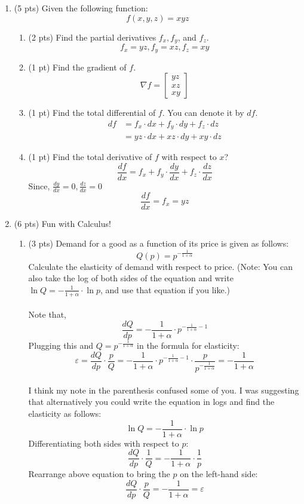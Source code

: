 \documentclass{./../../Latex/tests}
\begin{document}
\begin{enumerate}
\item (5 pts) Given the following function:
$$f(x,y,z) = xyz$$ 
\begin{enumerate}
\item (2 pts)  Find the partial derivatives $f_x, f_y$, and $f_z$. 
$$f_x=y z, f_y=x z, f_z=x y$$ 
\item (1 pt) Find the gradient of $f$. 
$$\nabla f=\left[\begin{array}{l}y z \\ x z \\ x y\end{array}\right]$$ 
\item (1 pt) Find the total differential of $f$. You can denote it by $d f$. 
$$\begin{aligned} d f &=f_x \cdot d x+f_y \cdot d y+f_z \cdot d z \\ &=y z \cdot d x+x z \cdot d y+x y \cdot d z
\end{aligned}$$	
\item (1 pt) Find the total derivative of $f$ with respect to $x$? 
$$  \frac{d f}{d x} =f_x+f_y \cdot \frac{d y}{d x}+f_z \cdot \frac{d z}{d x} $$
Since, $ \frac{d y}{d x}=0, \frac{d z}{d x}=0$ 
$$\frac{d f}{d x} =f_x=y z $$
\end{enumerate}

\item (6 pts) Fun with Calculus!
\begin{enumerate}
\item (3 pts) Demand for a good as a function of its price is given as follows:
$$ Q(p) = p^{-\frac{1}{1+\alpha}}  $$
Calculate the elasticity of demand with respect to price. (Note: You can also take the log of both sides of the equation and write $\ln Q = -\frac{1}{1+\alpha} \cdot \ln p$, and use that equation if you like.) \\~\\

Note that,
$$ \frac{dQ}{dp} = -\frac{1}{1+\alpha}\cdot p^{-\frac{1}{1+\alpha}-1}$$
Plugging this and $Q = p^{-\frac{1}{1+\alpha}}$ in the formula for elasticity:
$$ \varepsilon = \frac{dQ}{dp}\cdot \frac{p}{Q} = -\frac{1}{1+\alpha}\cdot p^{-\frac{1}{1+\alpha}-1} \cdot \frac{p}{p^{-\frac{1}{1+\alpha}}} = -\frac{1}{1+\alpha}  $$ \\

I think my note in the parenthesis confused some of you. I was suggesting that alternatively you could write the equation in logs and find the elasticity as follows:
$$\ln Q = -\frac{1}{1+\alpha} \cdot \ln p$$
Differentiating both sides with respect to $p$:
$$ \frac{dQ}{dp}\cdot\frac{1}{Q} = -\frac{1}{1+\alpha} \cdot \frac{1}{p}  $$
Rearrange above equation to bring the $p$ on the left-hand side:
$$ \frac{dQ}{dp}\cdot\frac{p}{Q} = -\frac{1}{1+\alpha} =\varepsilon  $$


\end{enumerate}
\end{enumerate}
\end{document}
